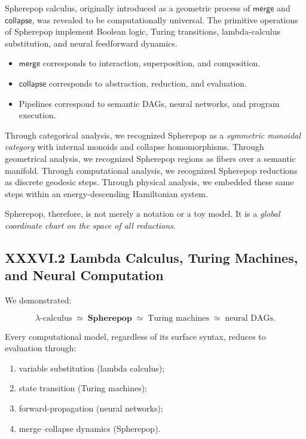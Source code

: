 \documentclass[11pt,letterpaper]{article}
\begin{document}
Spherepop calculus, originally introduced as a geometric process of 
$\mathsf{merge}$ and $\mathsf{collapse}$, was revealed to be 
computationally universal. The primitive operations of Spherepop
implement Boolean logic, Turing transitions, lambda-calculus substitution, 
and neural feedforward dynamics.

\begin{itemize}
  \item $\mathsf{merge}$ corresponds to interaction, superposition, and composition.
  \item $\mathsf{collapse}$ corresponds to abstraction, reduction, and evaluation.
  \item Pipelines correspond to semantic DAGs, neural networks, and program execution.
\end{itemize}

Through categorical analysis, we recognized Spherepop as a 
\emph{symmetric monoidal category} with internal monoids and collapse homomorphisms.  
Through geometrical analysis, we recognized Spherepop regions as fibers over a semantic manifold.  
Through computational analysis, we recognized Spherepop reductions as discrete geodesic steps.  
Through physical analysis, we embedded these same steps within an energy-descending Hamiltonian system.

Spherepop, therefore, is not merely a notation or a toy model.  
It is a \emph{global coordinate chart on the space of all reductions}.

\subsection{XXXVI.2 Lambda Calculus, Turing Machines, and Neural Computation}

We demonstrated:

\[
\lambda\text{-calculus}
\;\simeq\;
\mathbf{Spherepop}
\;\simeq\;
\text{Turing machines}
\;\simeq\;
\text{neural DAGs}.
\]

Every computational model, regardless of its surface syntax,
reduces to evaluation through:

\begin{enumerate}
    \item variable substitution (lambda calculus);
    \item state transition (Turing machines);
    \item forward-propagation (neural networks);
    \item merge--collapse dynamics (Spherepop).
\end{enumerate}
\end{document}
